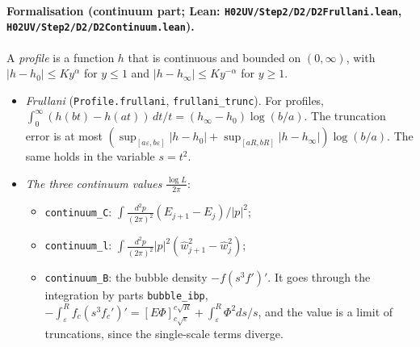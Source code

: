 \documentclass[11pt]{amsart}
\theoremstyle{definition}
\theoremstyle{remark}
\numberwithin{equation}{section}
\begin{document}
\paragraph{Formalisation (continuum part; Lean: \texttt{H02UV/Step2/D2/D2Frullani.lean}, \texttt{H02UV/Step2/D2/D2Continuum.lean}).}
A \emph{profile} is a function $h$ that is continuous and bounded on $(0,\infty)$, with
$|h-h_0|\le Ky^\alpha$ for $y\le1$ and $|h-h_\infty|\le Ky^{-\alpha}$ for $y\ge1$.
\begin{itemize}
\item \emph{Frullani} (\texttt{Profile.frullani}, \texttt{frullani\_trunc}). For profiles,
  $\int_0^\infty(h(bt)-h(at))\,dt/t=(h_\infty-h_0)\log(b/a)$. The truncation error is at most
  $(\sup_{[a\varepsilon,b\varepsilon]}|h-h_0|+\sup_{[aR,bR]}|h-h_\infty|)\log(b/a)$. The same holds in
  the variable $s=t^2$.
\item \emph{The three continuum values} $\frac{\log L}{2\pi}$:
  \begin{itemize}
  \item \texttt{continuum\_C}: $\int\frac{d^2p}{(2\pi)^2}(E_{j+1}-E_j)/|p|^2$;
  \item \texttt{continuum\_l}: $\int\frac{d^2p}{(2\pi)^2}|p|^2(\hat w_{j+1}^2-\hat w_j^2)$;
  \item \texttt{continuum\_B}: the bubble density $-f(s^3f')'$. It goes through the integration by
    parts \texttt{bubble\_ibp},
    $-\int_\varepsilon^Rf_c(s^3f_c')'=[E\Phi]_{c\sqrt\varepsilon}^{c\sqrt R}+\int_\varepsilon^R\Phi^2ds/s$,
    and the value is a limit of truncations, since the single-scale terms diverge.
  \end{itemize}
\end{itemize}
\end{document}
